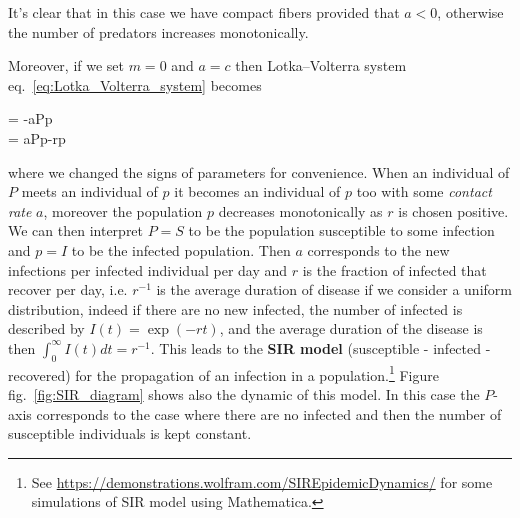 \documentclass[main.tex]{subfiles}
\begin{document}
\begin{example}
	\noindent
	It's clear that in this case we have compact fibers provided that $a < 0$, otherwise the number of predators increases monotonically.
	
	Moreover, if we set $m=0$ and $a = c$  then Lotka--Volterra system eq.~\eqref{eq:Lotka_Volterra_system} becomes 
	\begin{eqalign}
	\label{eq:SIR_model_system}
		\begin{dcases}
			 = -aPp\\
			 = aPp-rp
		\end{dcases}
	\end{eqalign}
	where we changed the signs of parameters for convenience. When an individual of $P$ meets an individual of $p$ it becomes an individual of $p$ too with some \emph{contact rate} $a$, moreover the population $p$ decreases monotonically as $r$ is chosen positive. We can then interpret $P=S$ to be the population susceptible to some infection and $p=I$ to be the infected population. Then $a$ corresponds to the new infections per infected individual per day and $r$ is the fraction of infected that recover per day, i.e. $r^{-1}$ is the average duration of disease if we consider a uniform distribution, indeed if there are no new infected, the number of infected is described by $I(t) = \exp(-rt)$, and the average duration of the disease is then $\int_0^\infty I(t) dt = r^{-1}$. This leads to the \textbf{SIR model} (susceptible - infected - recovered) for the propagation of an infection in a population.\footnote{See \url{https://demonstrations.wolfram.com/SIREpidemicDynamics/} for some simulations of SIR model using Mathematica.} Figure fig.~\ref{fig:SIR_diagram} shows also the dynamic of this model. In this case the $P$-axis corresponds to the case where there are no infected and then the number of susceptible individuals is kept constant. 
\end{example}
\end{document}
